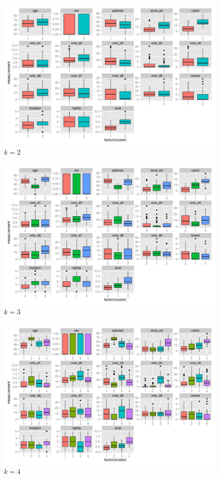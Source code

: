 \documentclass[letterpaper,12pt]{article}
\begin{document}
\begin{figure}[h]
  \centering
  \includegraphics[width=\linewidth]{c1-summaries-2.pdf}
  \caption{$k = 2$}
  \label{fig:c1-summaries-2}
\end{figure}
\begin{figure}[h]
  \centering
  \includegraphics[width=\linewidth]{c1-summaries-3.pdf}
  \caption{$k = 3$}
  \label{fig:c1-summaries-3}
\end{figure}
\begin{figure}[h]
  \centering
  \includegraphics[width=\linewidth]{c1-summaries-4.pdf}
  \caption{$k = 4$}
  \label{fig:c1-summaries-4}
\end{figure}
\end{document}
